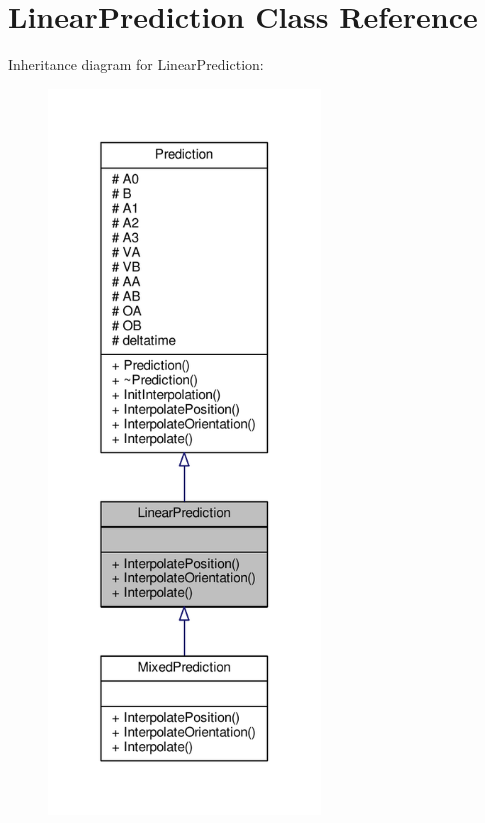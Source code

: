 \hypertarget{classLinearPrediction}{}\section{Linear\+Prediction Class Reference}
\label{classLinearPrediction}


Inheritance diagram for Linear\+Prediction\+:
\nopagebreak
\begin{figure}[H]
\begin{center}
\leavevmode
\includegraphics[width=205pt]{d3/d65/classLinearPrediction__inherit__graph}
\end{center}
\end{figure}


